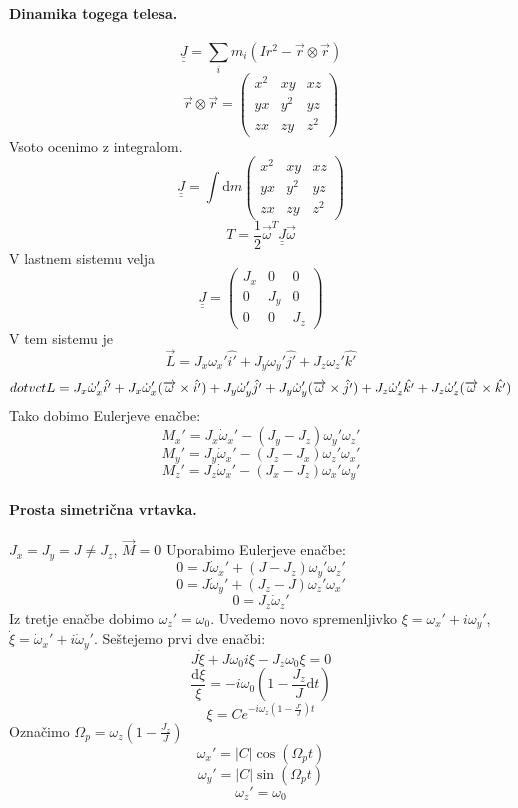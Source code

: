 \documentclass[a4paper]{article}
\newcommand{\vct}[1]{\overrightarrow{#1}}
\newcommand{\dif}{\mathrm{d}}
\newcommand{\duline}[1]{\underline{\underline{#1}}}
\begin{document}
\paragraph{Dinamika togega telesa.}
$$\duline{J} = \sum_i m_i(Ir^2 - \vct{r}\otimes\vct{r})$$
$$\vct{r}\otimes\vct{r} = \begin{pmatrix}
    x^2 & xy & xz \\
    yx & y^2 & yz \\
    zx & zy & z^2
\end{pmatrix}$$
Vsoto ocenimo z integralom.
$$\duline{J} = \int \dif m \begin{pmatrix}
    x^2 & xy & xz \\
    yx & y^2 & yz \\
    zx & zy & z^2
\end{pmatrix}$$
$$T = \frac{1}{2}\vct{\omega}^T\duline{J}\vct{\omega}$$
V lastnem sistemu velja $$\duline{J} = \begin{pmatrix}
    J_x & 0 & 0 \\
    0 & J_y & 0 \\
    0 & 0 & J_z
\end{pmatrix}$$
V tem sistemu je
$$\vct{L} = J_x \omega_x'\hat{i'} + J_y \omega_y'\hat{j'} + J_z \omega_z'\hat{k'}$$
$$\\dot{vct{L}} =
J_x \dot{\omega}_x'\hat{i'} + J_x\dot{\omega}_x'(\vct{\omega} \times \hat{i'}) +
J_y \dot{\omega}_y'\hat{j'} + J_y\dot{\omega}_y'(\vct{\omega} \times \hat{j'}) +
J_z \dot{\omega}_z'\hat{k'} + J_z\dot{\omega}_z'(\vct{\omega} \times \hat{k'})$$
Tako dobimo Eulerjeve enačbe:
$$M_x' = J_x\dot\omega_x' - (J_y-J_z)\omega_y'\omega_z'$$
$$M_y' = J_y\dot\omega_x' - (J_z-J_x)\omega_z'\omega_x'$$
$$M_z' = J_z\dot\omega_x' - (J_x-J_z)\omega_x'\omega_y'$$
\paragraph{Prosta simetrična vrtavka.} $J_x = J_y = J \neq J_z$, $\vct{M}=0$
Uporabimo Eulerjeve enačbe:
$$0 = J\dot{\omega}_x' + (J - J_z)\omega_y'\omega_z'$$
$$0 = J\dot{\omega}_y' + (J_z - J)\omega_z'\omega_x'$$
$$0 = J_z\dot\omega_z'$$
Iz tretje enačbe dobimo $\omega_z' = \omega_0$. Uvedemo novo spremenljivko $\xi = \omega_x' + i\omega_y'$, $\dot\xi = \dot\omega_x' + i\dot\omega_y'$. Seštejemo prvi dve enačbi:
$$J\dot\xi + J\omega_0i\xi - J_z\omega_0\xi = 0$$
$$\frac{\dif\xi}{\xi} = -i\omega_0\left(1 - \frac{J_z}{J}\dif t\right)$$
$$\xi = Ce^{-i\omega_z\left(1 - \frac{J'}{J}\right)t}$$
Označimo $\displaystyle{\Omega_p = \omega_z \left(1 - \frac{J_z}{J}\right)}$
$$\omega_x' = |C|\cos(\Omega_p t)$$
$$\omega_y' = |C|\sin(\Omega_p t)$$
$$\omega_z' = \omega_0$$
\end{document}
